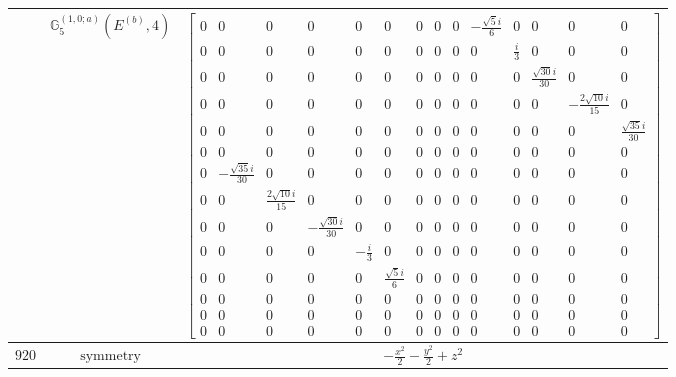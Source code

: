 \documentclass[fleqn,8pt,landscape]{jsarticle}
\begin{document}
\begin{longtable}{ccc}
$  $ & $ \mathbb{G}_{5}^{(1,0;a)}(E^{(b)},4) $ & $ \begin{bmatrix} 0 & 0 & 0 & 0 & 0 & 0 & 0 & 0 & 0 & - \frac{\sqrt{5} i}{6} & 0 & 0 & 0 & 0 \\ 0 & 0 & 0 & 0 & 0 & 0 & 0 & 0 & 0 & 0 & \frac{i}{3} & 0 & 0 & 0 \\ 0 & 0 & 0 & 0 & 0 & 0 & 0 & 0 & 0 & 0 & 0 & \frac{\sqrt{30} i}{30} & 0 & 0 \\ 0 & 0 & 0 & 0 & 0 & 0 & 0 & 0 & 0 & 0 & 0 & 0 & - \frac{2 \sqrt{10} i}{15} & 0 \\ 0 & 0 & 0 & 0 & 0 & 0 & 0 & 0 & 0 & 0 & 0 & 0 & 0 & \frac{\sqrt{35} i}{30} \\ 0 & 0 & 0 & 0 & 0 & 0 & 0 & 0 & 0 & 0 & 0 & 0 & 0 & 0 \\ 0 & - \frac{\sqrt{35} i}{30} & 0 & 0 & 0 & 0 & 0 & 0 & 0 & 0 & 0 & 0 & 0 & 0 \\ 0 & 0 & \frac{2 \sqrt{10} i}{15} & 0 & 0 & 0 & 0 & 0 & 0 & 0 & 0 & 0 & 0 & 0 \\ 0 & 0 & 0 & - \frac{\sqrt{30} i}{30} & 0 & 0 & 0 & 0 & 0 & 0 & 0 & 0 & 0 & 0 \\ 0 & 0 & 0 & 0 & - \frac{i}{3} & 0 & 0 & 0 & 0 & 0 & 0 & 0 & 0 & 0 \\ 0 & 0 & 0 & 0 & 0 & \frac{\sqrt{5} i}{6} & 0 & 0 & 0 & 0 & 0 & 0 & 0 & 0 \\ 0 & 0 & 0 & 0 & 0 & 0 & 0 & 0 & 0 & 0 & 0 & 0 & 0 & 0 \\ 0 & 0 & 0 & 0 & 0 & 0 & 0 & 0 & 0 & 0 & 0 & 0 & 0 & 0 \\ 0 & 0 & 0 & 0 & 0 & 0 & 0 & 0 & 0 & 0 & 0 & 0 & 0 & 0 \end{bmatrix} $ \\ \hline
$ 920 $ & $ \text{symmetry} $ & $ - \frac{x^{2}}{2} - \frac{y^{2}}{2} + z^{2} $ \\

\end{longtable}
\end{document}
